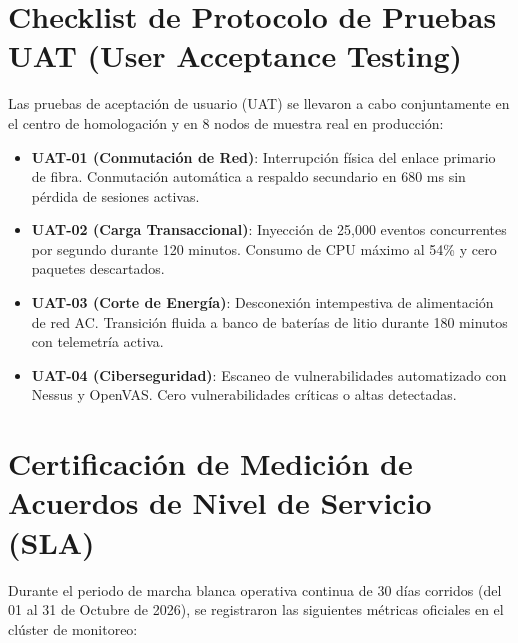 \documentclass[11pt,letterpaper]{article}
\begin{document}
\vspace{0.6em}

\section{Checklist de Protocolo de Pruebas UAT (User Acceptance Testing)}

Las pruebas de aceptaci\'on de usuario (UAT) se llevaron a cabo conjuntamente en el centro de homologaci\'on y en 8 nodos de muestra real en producci\'on:

\vspace{0.3em}

\begin{itemize}[leftmargin=1.5em, itemsep=2pt, topsep=1pt]
  \item[\textbf{\color{corpSuccess}[APROBADO]}] \textbf{UAT-01 (Conmutaci\'on de Red)}: Interrupci\'on f\'isica del enlace primario de fibra. Conmutaci\'on autom\'atica a respaldo secundario en 680 ms sin p\'erdida de sesiones activas.
  \item[\textbf{\color{corpSuccess}[APROBADO]}] \textbf{UAT-02 (Carga Transaccional)}: Inyecci\'on de 25,000 eventos concurrentes por segundo durante 120 minutos. Consumo de CPU m\'aximo al 54\% y cero paquetes descartados.
  \item[\textbf{\color{corpSuccess}[APROBADO]}] \textbf{UAT-03 (Corte de Energ\'ia)}: Desconexi\'on intempestiva de alimentaci\'on de red AC. Transici\'on fluida a banco de bater\'ias de litio durante 180 minutos con telemetr\'ia activa.
  \item[\textbf{\color{corpSuccess}[APROBADO]}] \textbf{UAT-04 (Ciberseguridad)}: Escaneo de vulnerabilidades automatizado con Nessus y OpenVAS. Cero vulnerabilidades cr\'iticas o altas detectadas.
\end{itemize}

\newpage

\section{Certificaci\'on de Medici\'on de Acuerdos de Nivel de Servicio (SLA)}

Durante el periodo de marcha blanca operativa continua de 30 d\'ias corridos (del 01 al 31 de Octubre de 2026), se registraron las siguientes m\'etricas oficiales en el cl\'uster de monitoreo:
\end{document}
